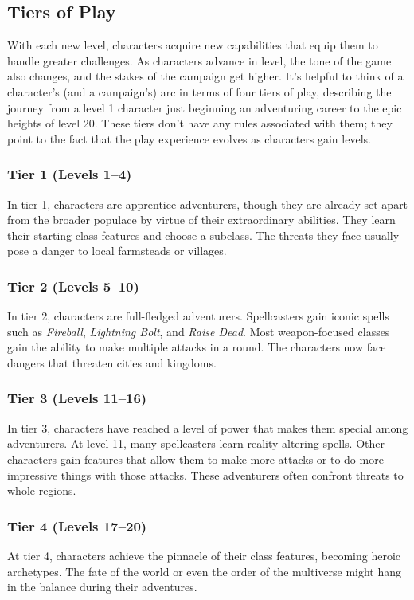 \documentclass[10pt,a4paper,twoside,bg=print,twocolumn,openany,nodeprecatedcode]{dndbook}
\begin{document}
\subsection{Tiers of Play}
With each new level, characters acquire new capabilities that equip them to handle greater challenges. As characters advance in level, the tone of the game also changes, and the stakes of the campaign get higher. It's helpful to think of a character's (and a campaign's) arc in terms of four tiers of play, describing the journey from a level 1 character just beginning an adventuring career to the epic heights of level 20. These tiers don't have any rules associated with them; they point to the fact that the play experience evolves as characters gain levels.

\subsubsection{Tier 1 (Levels 1–4)}
In tier 1, characters are apprentice adventurers, though they are already set apart from the broader populace by virtue of their extraordinary abilities. They learn their starting class features and choose a subclass. The threats they face usually pose a danger to local farmsteads or villages.

\subsubsection{Tier 2 (Levels 5–10)}
In tier 2, characters are full-fledged adventurers. Spellcasters gain iconic spells such as \textit{Fireball}, \textit{Lightning Bolt}, and \textit{Raise Dead}. Most weapon-focused classes gain the ability to make multiple attacks in a round. The characters now face dangers that threaten cities and kingdoms.

\subsubsection{Tier 3 (Levels 11–16)}
In tier 3, characters have reached a level of power that makes them special among adventurers. At level 11, many spellcasters learn reality-altering spells. Other characters gain features that allow them to make more attacks or to do more impressive things with those attacks. These adventurers often confront threats to whole regions.

\subsubsection{Tier 4 (Levels 17–20)}
At tier 4, characters achieve the pinnacle of their class features, becoming heroic archetypes. The fate of the world or even the order of the multiverse might hang in the balance during their adventures.
\end{document}
